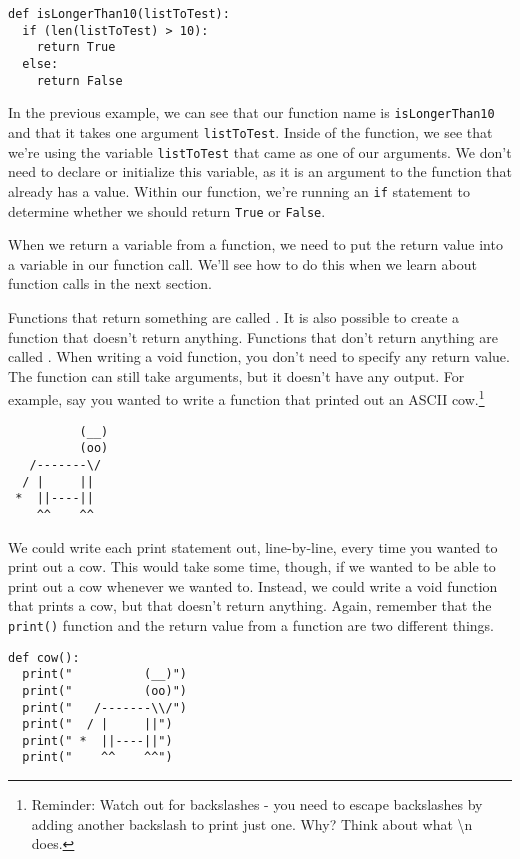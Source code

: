 \begin{lstlisting}[style=pippython]
def isLongerThan10(listToTest):
  if (len(listToTest) > 10):
    return True
  else:
    return False
\end{lstlisting}
In the previous example, we can see that our function name is \verb|isLongerThan10| and that it takes one argument \verb|listToTest|. Inside of the function, we see that we're using the variable \verb|listToTest| that came as one of our arguments. We don't need to declare or initialize this variable, as it is an argument to the function that already has a value. Within our function, we're running an \verb|if| statement to determine whether we should return \verb|True| or \verb|False|.\par
When we return a variable from a function, we need to put the return value into a variable in our function call. We'll see how to do this when we learn about function calls in the next section.\par
Functions that return something are called . It is also possible to create a function that doesn't return anything. Functions that don't return anything are called . When writing a void function, you don't need to specify any return value. The function can still take arguments, but it doesn't have any output. For example, say you wanted to write a function that printed out an ASCII cow.\footnote{Reminder: Watch out for backslashes - you need to escape backslashes by adding another backslash to print just one. Why? Think about what \textbackslash n does.}\par
\begin{lstlisting}
          (__)
          (oo)
   /-------\/
  / |     ||
 *  ||----||
    ^^    ^^
\end{lstlisting}
We could write each print statement out, line-by-line, every time you wanted to print out a cow. This would take some time, though, if we wanted to be able to print out a cow whenever we wanted to. Instead, we could write a void function that prints a cow, but that doesn't return anything. Again, remember that the \verb|print()| function and the return value from a function are two different things.\par
\begin{lstlisting}[style=pippython]
def cow():
  print("          (__)")
  print("          (oo)")
  print("   /-------\\/")
  print("  / |     ||")
  print(" *  ||----||")
  print("    ^^    ^^")
\end{lstlisting}
